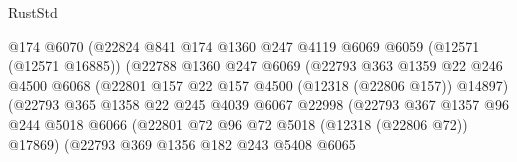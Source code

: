 \begin{lexlean}{RustStd}
\begin{coremodule}
                                    @174
                                    @6070
                                    (@22824
                                      @841
                                      @174
                                      @1360
                                      @247
                                      @4119
                                      @6069
                                      @6059
                                      (@12571 (@12571 @16885))
                                      (@22788
                                        @1360
                                        @247
                                        @6069
                                        (@22793
                                          @363
                                          @1359
                                          @22
                                          @246
                                          @4500
                                          @6068
                                          (@22801 @157 @22 @157 @4500 (@12318 (@22806 @157)) @14897)
                                          (@22793
                                            @365
                                            @1358
                                            @22
                                            @245
                                            @4039
                                            @6067
                                            @22998
                                            (@22793
                                              @367
                                              @1357
                                              @96
                                              @244
                                              @5018
                                              @6066
                                              (@22801
                                                @72
                                                @96
                                                @72
                                                @5018
                                                (@12318 (@22806 @72))
                                                @17869)
                                              (@22793
                                                @369
                                                @1356
                                                @182
                                                @243
                                                @5408
                                                @6065

\end{coremodule}
\end{lexlean}
